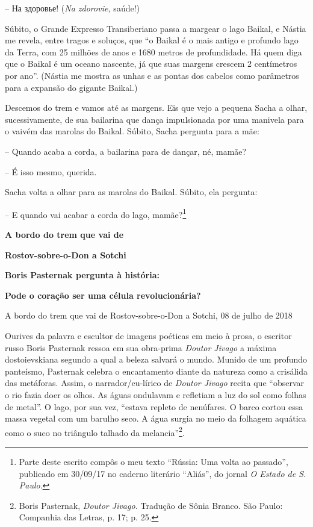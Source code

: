 -- На здоровье! (\emph{Na zdorovie,} saúde!)

Súbito, o Grande Expresso Transiberiano passa a margear o lago Baikal, e
Nástia me revela, entre tragos e soluços, que ``o Baikal é o mais antigo
e profundo lago da Terra, com 25 milhões de anos e 1680 metros de
profundidade. Há quem diga que o Baikal é um oceano nascente, já que
suas margens crescem 2 centímetros por ano''. (Nástia me mostra as unhas
e as pontas dos cabelos como parâmetros para a expansão do gigante
Baikal.)

Descemos do trem e vamos até as margens. Eis que vejo a pequena Sacha a
olhar, sucessivamente, de sua bailarina que dança impulsionada por uma
manivela para o vaivém das marolas do Baikal. Súbito, Sacha pergunta
para a mãe:

-- Quando acaba a corda, a bailarina para de dançar, né, mamãe?

-- É isso mesmo, querida.

Sacha volta a olhar para as marolas do Baikal. Súbito, ela pergunta:

-- E quando vai acabar a corda do lago, mamãe?\footnote{Parte deste
  escrito compôs o meu texto ``Rússia: Uma volta ao passado'', publicado
  em 30/09/17 no caderno literário ``Aliás'', do jornal \emph{O Estado
  de S. Paulo}.}

\textbf{A bordo do trem que vai de }

\textbf{Rostov-sobre-o-Don a Sotchi}

\textbf{Boris Pasternak pergunta à história: }

\textbf{Pode o coração ser uma célula revolucionária?}

A bordo do trem que vai de Rostov-sobre-o-Don a Sotchi, 08 de julho de
2018

Ourives da palavra e escultor de imagens poéticas em meio à prosa, o
escritor russo Boris Pasternak ressoa em sua obra-prima \emph{Doutor
Jivago} a máxima dostoievskiana segundo a qual a beleza salvará o mundo.
Munido de um profundo panteísmo, Pasternak celebra o encantamento diante
da natureza como a crisálida das metáforas. Assim, o narrador/eu-lírico
de \emph{Doutor Jivago} recita que ``observar o rio fazia doer os olhos.
As águas ondulavam e refletiam a luz do sol como folhas de metal''. O
lago, por sua vez, ``estava repleto de nenúfares. O barco cortou essa
massa vegetal com um barulho seco. A água surgia no meio da folhagem
aquática como o suco no triângulo talhado da melancia''\footnote{Boris
  Pasternak, \emph{Doutor Jivago.} Tradução de Sônia Branco. São Paulo:
  Companhia das Letras, p. 17; p. 25.}.

